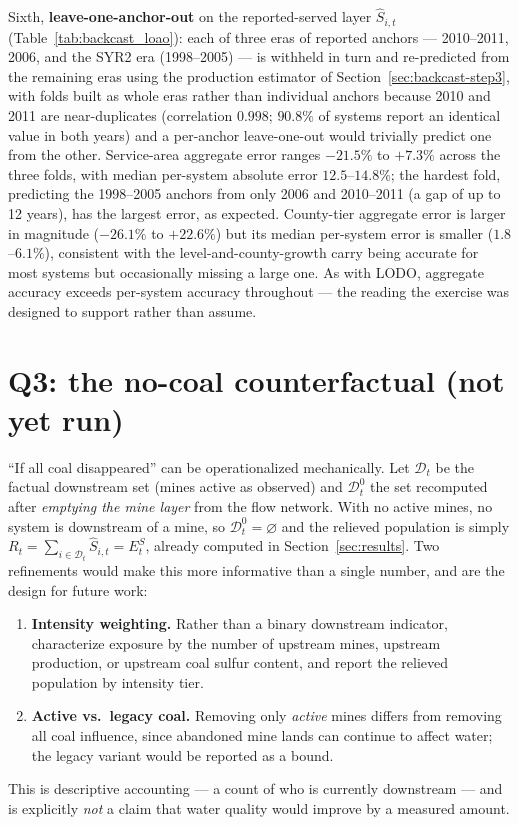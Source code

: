 \documentclass[11pt]{article}
\begin{document}


Sixth, \textbf{leave-one-anchor-out} on the reported-served layer $\hat
S_{i,t}$ (Table~\ref{tab:backcast_loao}): each of three eras of reported
anchors --- 2010--2011, 2006, and the SYR2 era (1998--2005) --- is withheld in
turn and re-predicted from the remaining eras using the production estimator
of Section~\ref{sec:backcast-step3}, with folds built as whole eras rather
than individual anchors because 2010 and 2011 are near-duplicates
(correlation $0.998$; $90.8\%$ of systems report an identical value in both
years) and a per-anchor leave-one-out would trivially predict one from the
other. Service-area aggregate error ranges $-21.5\%$ to $+7.3\%$ across the
three folds, with median per-system absolute error $12.5$--$14.8\%$; the
hardest fold, predicting the 1998--2005 anchors from only 2006 and
2010--2011 (a gap of up to 12 years), has the largest error, as expected.
County-tier aggregate error is larger in magnitude ($-26.1\%$ to $+22.6\%$)
but its median per-system error is smaller ($1.8$--$6.1\%$), consistent with
the level-and-county-growth carry being accurate for most systems but
occasionally missing a large one. As with LODO, aggregate accuracy exceeds
per-system accuracy throughout --- the reading the exercise was designed to
support rather than assume.



\section{Q3: the no-coal counterfactual (not yet run)}
\label{sec:counterfactual}

``If all coal disappeared'' can be operationalized mechanically. Let
$\mathcal{D}_t$ be the factual downstream set (mines active as observed) and
$\mathcal{D}^{0}_t$ the set recomputed after \emph{emptying the mine layer}
from the flow network. With no active mines, no system is downstream of a
mine, so $\mathcal{D}^{0}_t=\varnothing$ and the relieved population is simply
$R_t = \sum_{i\in\mathcal{D}_t}\hat S_{i,t} = E^S_t$, already computed in
Section~\ref{sec:results}. Two refinements would make this more informative
than a single number, and are the design for future work:
\begin{enumerate}[leftmargin=2em]
  \item \textbf{Intensity weighting.} Rather than a binary downstream
    indicator, characterize exposure by the number of upstream mines,
    upstream production, or upstream coal sulfur content, and report the
    relieved population by intensity tier.
  \item \textbf{Active vs.\ legacy coal.} Removing only \emph{active} mines
    differs from removing all coal influence, since abandoned mine lands can
    continue to affect water; the legacy variant would be reported as a
    bound.
\end{enumerate}
This is descriptive accounting --- a count of who is currently downstream ---
and is explicitly \emph{not} a claim that water quality would improve by a
measured amount.
\end{document}
